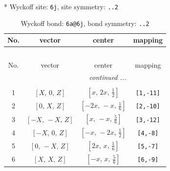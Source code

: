 \documentclass[fleqn,8pt]{jsarticle}
\begin{document}
* Wyckoff site: {\tt 6j}, site symmetry: {\tt ..2}
\renewcommand{\arraystretch}{1.2}
\begin{longtable}{cccc}
\caption{Wyckoff bond: {\tt 6a@6j}, bond symmetry: {\tt ..2}}
 \\
 \hline \hline
No. & vector & center & mapping \\ \hline \endfirsthead

\multicolumn{3}{l}{\tablename\ \thetable{}} \\
 \hline \hline
No. & vector & center & mapping \\ \hline \endhead

 \hline \hline
\multicolumn{3}{r}{\footnotesize\it continued ...} \\ \endfoot

 \hline \hline
\multicolumn{3}{r}{} \\ \endlastfoot

1 & $\left[ X,\, 0,\, Z \right]$ & $\left[ x,\, 2 x,\, \frac{1}{2} \right]$ & {\tt [1,-11]} \\ \hline
2 & $\left[ 0,\, X,\, Z \right]$ & $\left[ - 2 x,\, - x,\, \frac{1}{6} \right]$ & {\tt [2,-10]} \\ \hline
3 & $\left[ - X,\, - X,\, Z \right]$ & $\left[ x,\, - x,\, \frac{5}{6} \right]$ & {\tt [3,-12]} \\ \hline
4 & $\left[ - X,\, 0,\, Z \right]$ & $\left[ - x,\, - 2 x,\, \frac{1}{2} \right]$ & {\tt [4,-8]} \\ \hline
5 & $\left[ 0,\, - X,\, Z \right]$ & $\left[ 2 x,\, x,\, \frac{1}{6} \right]$ & {\tt [5,-7]} \\ \hline
6 & $\left[ X,\, X,\, Z \right]$ & $\left[ - x,\, x,\, \frac{5}{6} \right]$ & {\tt [6,-9]} \\
\end{longtable}
\renewcommand{\arraystretch}{1.2}
\end{document}
